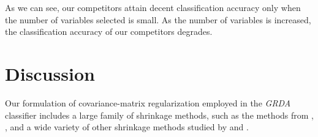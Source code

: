 \documentclass[11pt]{article}
\begin{document}
As we can see, our competitors attain decent classification accuracy only when the number of variables selected is small. As the number of variables is increased, the classification accuracy of our competitors degrades.

\section{Discussion}

Our formulation of covariance-matrix regularization employed in the \emph{GRDA} classifier includes a large family of shrinkage methods, such as the methods from \cite{Srivastava:2007ww}, \cite{Rao:1971ul}, and a wide variety of other shrinkage methods studied by \cite{Ramey:2011ji} and \cite*{Xu:2009fl}.
	



\end{document}
